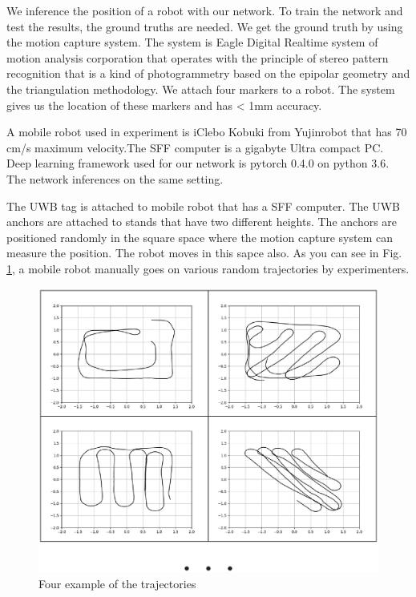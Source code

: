 \documentclass[letterpaper, 10 pt, conference]{ieeeconf}  %
\begin{document}
We inference the position of a robot with our network. To train the network and test the results, the ground truths are needed. We get the ground truth by using the motion capture system. The system is Eagle Digital Realtime system of motion analysis corporation that operates with the principle of stereo pattern recognition that is a kind of photogrammetry based on the epipolar geometry and the triangulation methodology. We attach four markers to a robot. The system gives us the location of these markers and has < 1mm accuracy.

A mobile robot used in experiment is iClebo Kobuki from Yujinrobot that has 70 cm/s maximum velocity.The SFF computer is a gigabyte Ultra compact PC. Deep learning framework used for our network is pytorch 0.4.0 on python 3.6. The network inferences on the same setting.

The UWB tag is attached to mobile robot that has a SFF computer. The UWB anchors are attached to stands that have two different heights. The anchors are positioned randomly in the square space where the motion capture system can measure the position. The robot moves in this sapce also. As you can see in Fig. \ref{fig:paths}, a mobile robot manually goes on various random trajectories by experimenters.

\begin{figure}[h!]
	\centering
	\includegraphics[width=0.9\linewidth]{image/paths_1}
	\caption{Four example of the trajectories}
	\label{fig:paths} 
\end{figure}
\end{document}
